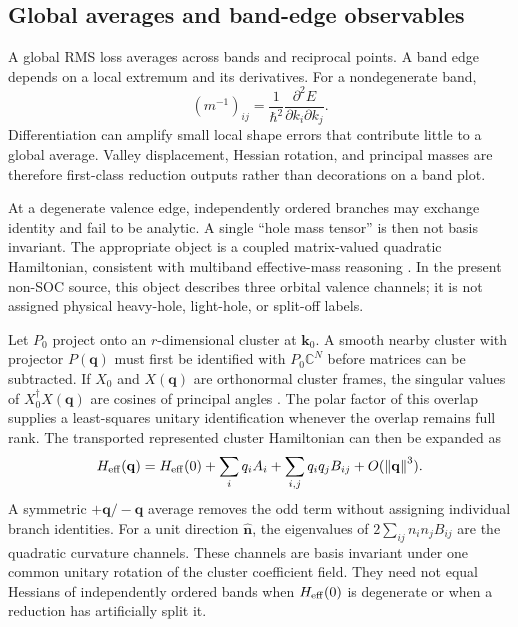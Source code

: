 \documentclass[11pt]{article}
\theoremstyle{definition}
\newcommand{\norm}[1]{\left\lVert#1\right\rVert}
\newcommand{\C}{\mathbb C}
\newcommand{\kvec}{\mathbf k}
\newcommand{\qvec}{\mathbf q}
\begin{document}
\subsection{Global averages and band-edge observables}

A global RMS loss averages across bands and reciprocal points.  A band edge depends on a
local extremum and its derivatives.  For a nondegenerate band,
\begin{equation}
 (m^{-1})_{ij}=\frac{1}{\hbar^2}
 \frac{\partial^2E}{\partial k_i\partial k_j}.
 \label{eq:mass-tensor}
\end{equation}
Differentiation can amplify small local shape errors that contribute little to a global
average.  Valley displacement, Hessian rotation, and principal masses are therefore
first-class reduction outputs rather than decorations on a band plot.

At a degenerate valence edge, independently ordered branches may exchange identity and
fail to be analytic.  A single ``hole mass tensor'' is then not basis invariant.  The
appropriate object is a coupled matrix-valued quadratic Hamiltonian, consistent with
multiband effective-mass reasoning \cite{LuttingerKohn1955}.  In the present non-SOC
source, this object describes three orbital valence channels; it is not assigned physical
heavy-hole, light-hole, or split-off labels.

Let $P_0$ project onto an $r$-dimensional cluster at $\kvec_0$.  A smooth nearby cluster
with projector $P(\qvec)$ must first be identified with $P_0\C^N$ before matrices can be
subtracted.  If $X_0$ and $X(\qvec)$ are orthonormal cluster frames, the singular values
of $X_0^\dagger X(\qvec)$ are cosines of principal angles
\cite{davisKahan1970}.  The polar factor of this
overlap supplies a least-squares unitary identification whenever the overlap remains
full rank.  The transported represented cluster Hamiltonian can then be expanded as
\begin{equation}
 H_{\rm eff}(\qvec)=H_{\rm eff}(0)
 +\sum_i q_i A_i+\sum_{i,j}q_iq_jB_{ij}+O(\norm{\qvec}^3).
 \label{eq:general-cluster-expansion}
\end{equation}
A symmetric $+\qvec/-\qvec$ average removes the odd term without assigning individual
branch identities.  For a unit direction $\hat{\mathbf n}$, the eigenvalues of
$2\sum_{ij}n_in_jB_{ij}$ are the quadratic curvature channels.  These channels are
basis invariant under one common unitary rotation of the cluster coefficient field.
They need not equal Hessians of independently ordered bands when $H_{\rm eff}(0)$ is
degenerate or when a reduction has artificially split it.
\end{document}

